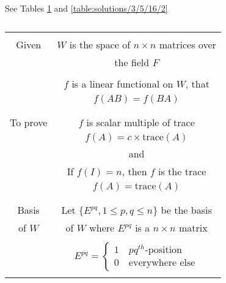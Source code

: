 See Tables \ref{table:solutions/3/5/16/1} and \ref{table:solutions/3/5/16/2}

\begin{table}[h!]
\begin{center}
\resizebox{\columnwidth}{!}
{
\begin{tabular}{|c|c|}
\hline
& \\
Given &  $W$ is the space of $n \times n$ matrices over\\
&  the field $F$\\
 & \\
& $f$ is a linear functional on $W$, that\\
& $f(AB) = f(BA)$\\
& \\
\hline
& \\
To prove & $f$ is scalar multiple of trace \\
& $f(A) = c\times \text{trace}(A)$\\
 & and\\
& If $f(I)=n$, then $f$ is the trace\\
& $f(A) = \text{trace}(A)$\\
& \\
\hline
& \\
Basis & Let $\{E^{pq}, 1\leq p,q \leq n\}$ be the basis\\
of $W$ &  of $W$ where $E^{pq}$ is a  $n \times n$ matrix\\
& \\
& $E^{pq} = \begin{cases} 1  \quad pq^{th} \text{-position}\\ 0 \quad \text{everywhere else}\end{cases}$\\
& \\
\hline
\end{tabular}
}
\end{center}
\caption{}
\label{table:solutions/3/5/16/1}
\end{table}
